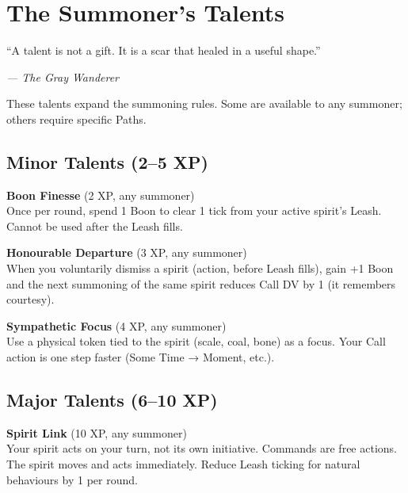 \documentclass[10pt,a5paper]{book}
\begin{document}
\clearpage

\chapter{The Summoner’s Talents}
\epigraph{“A talent is not a gift. It is a scar that healed in a useful shape.”}{\textit{— The Gray Wanderer}}

These talents expand the summoning rules. Some are available to any summoner; others require specific Paths.

\section{Minor Talents (2–5 XP)}

\begin{tcolorbox}[colback=green!5, colframe=green!70]
\textbf{Boon Finesse} (2 XP, any summoner) \\
Once per round, spend 1 Boon to clear 1 tick from your active spirit’s Leash. Cannot be used after the Leash fills.
\end{tcolorbox}

\begin{tcolorbox}[colback=green!5, colframe=green!70]
\textbf{Honourable Departure} (3 XP, any summoner) \\
When you voluntarily dismiss a spirit (action, before Leash fills), gain +1 Boon and the next summoning of the same spirit reduces Call DV by 1 (it remembers courtesy).
\end{tcolorbox}

\begin{tcolorbox}[colback=green!5, colframe=green!70]
\textbf{Sympathetic Focus} (4 XP, any summoner) \\
Use a physical token tied to the spirit (scale, coal, bone) as a focus. Your Call action is one step faster (Some Time → Moment, etc.).
\end{tcolorbox}

\section{Major Talents (6–10 XP)}

\begin{tcolorbox}[colback=blue!5, colframe=blue!70]
\textbf{Spirit Link} (10 XP, any summoner) \\
Your spirit acts on your turn, not its own initiative. Commands are free actions. The spirit moves and acts immediately. Reduce Leash ticking for natural behaviours by 1 per round.
\end{tcolorbox}
\end{document}
